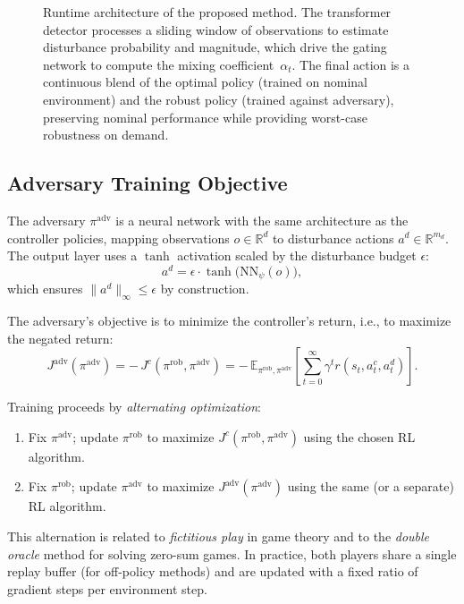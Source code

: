 \documentclass[conference]{IEEEtran}
\newcommand{\E}{\mathbb{E}}
\newcommand{\R}{\mathbb{R}}
\newcommand{\pirob}{\pi^{\text{rob}}}
\newcommand{\piadv}{\pi^{\text{adv}}}
\begin{document}
\begin{figure}[t]
\caption{Runtime architecture of the proposed method.  The transformer
detector processes a sliding window of observations to estimate disturbance
probability and magnitude, which drive the gating network to compute the
mixing coefficient~$\alpha_t$.  The final action is a continuous blend of
the optimal policy (trained on nominal environment) and the robust policy
(trained against adversary), preserving nominal performance while providing
worst-case robustness on demand.}
\label{fig:architecture}
\end{figure}

\subsection{Adversary Training Objective}\label{sec:adv_training}

The adversary $\piadv$ is a neural network with the same architecture as
the controller policies, mapping observations $o \in \R^d$ to disturbance
actions $a^d \in \R^{m_d}$.  The output layer uses a $\tanh$ activation
scaled by the disturbance budget $\epsilon$:
\begin{equation}\label{eq:adv_output}
a^d = \epsilon \cdot \tanh\!\big(\text{NN}_{\psi}(o)\big),
\end{equation}
which ensures $\|a^d\|_\infty \leq \epsilon$ by construction.

The adversary's objective is to minimize the controller's return, i.e., to
maximize the negated return:
\begin{equation}\label{eq:adv_obj}
J^{\text{adv}}(\piadv) = -\,J^c(\pirob, \piadv) =
-\,\E_{\pirob,\piadv}\!\left[\sum_{t=0}^{\infty}\gamma^t
  r(s_t, a_t^c, a_t^d)\right].
\end{equation}

Training proceeds by \emph{alternating optimization}:
\begin{enumerate}
\item Fix $\piadv$; update $\pirob$ to maximize $J^c(\pirob, \piadv)$
  using the chosen RL algorithm.
\item Fix $\pirob$; update $\piadv$ to maximize $J^{\text{adv}}(\piadv)$
  using the same (or a separate) RL algorithm.
\end{enumerate}
This alternation is related to \emph{fictitious play} in game theory
and to the \emph{double oracle} method for solving zero-sum games.  In
practice, both players share a single replay buffer (for off-policy
methods) and are updated with a fixed ratio of gradient steps per
environment step.
\end{document}
